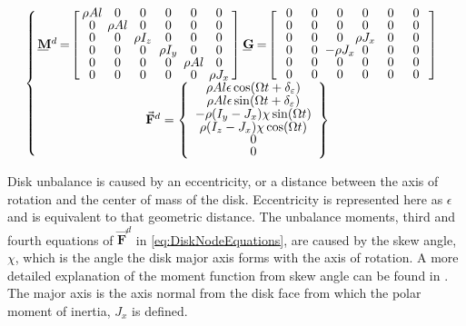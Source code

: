 \begin{equation}\label{eq:DiskNodeEquations}
\def\cs{3em}
\left\{
\begin{array}{@{}c}
\arraycolsep=1pt\begin{array}{rlrl}
\bunderline{\mathbf{M}}^d & =\!\left[\def\arraystretch{.8}\arraycolsep=-.5em\begin{array}{cccccc}
\makebox[\cs]{$\rho Al$}&\makebox[\cs]{0}&\makebox[\cs]{0}&\makebox[\cs]{0}&\makebox[\cs]{0}&\makebox[\cs]{0}\\
0&\rho Al&0&0&0&0\\
0&0&\rho I_{z}&0&0&0\\
0&0&0&\rho I_{y}&0&0\\
0&0&0&0&\rho Al&0\\
0&0&0&0&0&\rho J_x
\end{array}\right] & \bunderline{\mathbf{G}} & = \!\left[\def\arraystretch{.8}\arraycolsep=-.5em\begin{array}{cccccc}
\makebox[\cs]{0}&\makebox[\cs]{0}&\makebox[\cs]{0}&\makebox[\cs]{0}&\makebox[\cs]{0}&\makebox[\cs]{0}\\
0&0&0&0&0&0\\
0&0&0&\rho J_x&0&0\\
0&0&-\rho J_x&0&0&0\\
0&0&0&0&0&0\\
0&0&0&0&0&0
\end{array}\right]\\
\end{array}\\
\\[-1em]
\vec{\mathbf{F}}^d=\left\{\def\arraystretch{.8}\begin{array}{c}
\rho Al\epsilon\cos(\Omega t + \delta_\varepsilon)\\
\rho Al\epsilon\sin(\Omega t + \delta_\varepsilon)\\
-\rho( I_y-J_x)\chi\sin(\Omega t)\\
\rho( I_z-J_x)\chi\cos(\Omega t)\\
0\\
0
\end{array}\right\}
\end{array}\right.
\end{equation}
\par
 Disk unbalance is caused by an eccentricity, or a distance between the axis of rotation and the center of mass of the disk. Eccentricity is represented here as $\epsilon$ and is equivalent to that geometric distance. The unbalance moments, third and fourth equations of $ \vec{\mathbf{F}}^d $ in \eqref{eq:DiskNodeEquations}, are caused by the skew angle, $ \chi $, which is the angle the disk major axis forms with the axis of rotation. A more detailed explanation of the moment function from skew angle can be found in \cite{muszynska2005rotordynamics}. The major axis is the axis normal from the disk face from which the polar moment of inertia, $ J_x $ is defined.
